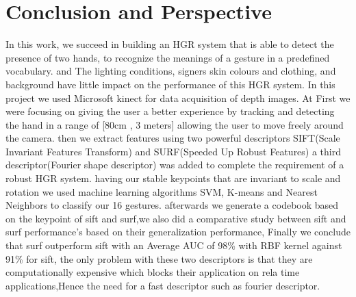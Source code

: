 \chapter*{Conclusion and Perspective}






In this work, we succeed in building an HGR system that is able to detect the presence of two hands, to recognize the meanings of a gesture  in a predefined vocabulary. and The lighting conditions, signers skin colours and clothing, and background  have little impact on the performance of this HGR system. 
In this project we used Microsoft kinect for data acquisition of depth images. At  First we were focusing on giving the user a better experience by tracking and  detecting the hand  in a range of [80cm , 3 meters]  allowing the  user to move freely around the camera. then we extract features using two powerful descriptors SIFT(Scale Invariant Features Transform) and SURF(Speeded Up Robust Features) a  third descriptor(Fourier shape descriptor)  was added to complete the requirement of a robust HGR system. having our stable keypoints that are invariant to scale and rotation  we used machine learning algorithms SVM, K-means and Nearest Neighbors  to classify our  16 gestures. afterwards we generate a codebook based on the keypoint of sift and surf,we also did  a comparative study between sift and surf performance's based on their generalization performance, Finally we conclude that surf outperform sift with an Average AUC of 98\% with RBF kernel against 91\% for sift, the only problem with these two descriptors is that they are computationally expensive which blocks their application on rela time applications,Hence the need for a fast descriptor such as fourier descriptor.

